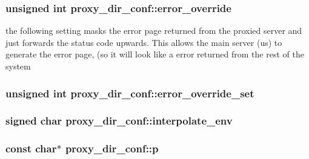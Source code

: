 \subsubsection[{\texorpdfstring{error\+\_\+override}{error_override}}]{\setlength{\rightskip}{0pt plus 5cm}unsigned {\bf int} proxy\+\_\+dir\+\_\+conf\+::error\+\_\+override}\hypertarget{structproxy__dir__conf_a3aea74a60ef8fc76563cb6f4a9ebb3d1}{}\label{structproxy__dir__conf_a3aea74a60ef8fc76563cb6f4a9ebb3d1}
the following setting masks the error page returned from the \textquotesingle{}proxied server\textquotesingle{} and just forwards the status code upwards. This allows the main server (us) to generate the error page, (so it will look like a error returned from the rest of the system 
\subsubsection[{\texorpdfstring{error\+\_\+override\+\_\+set}{error_override_set}}]{\setlength{\rightskip}{0pt plus 5cm}unsigned {\bf int} proxy\+\_\+dir\+\_\+conf\+::error\+\_\+override\+\_\+set}\hypertarget{structproxy__dir__conf_a394c68f9c1ec6a3b7868c544fc7722bf}{}\label{structproxy__dir__conf_a394c68f9c1ec6a3b7868c544fc7722bf}
\subsubsection[{\texorpdfstring{interpolate\+\_\+env}{interpolate_env}}]{\setlength{\rightskip}{0pt plus 5cm}signed char proxy\+\_\+dir\+\_\+conf\+::interpolate\+\_\+env}\hypertarget{structproxy__dir__conf_a14c09f00a8ef3fd674edf324e204f716}{}\label{structproxy__dir__conf_a14c09f00a8ef3fd674edf324e204f716}
\subsubsection[{\texorpdfstring{p}{p}}]{\setlength{\rightskip}{0pt plus 5cm}const char$\ast$ proxy\+\_\+dir\+\_\+conf\+::p}\hypertarget{structproxy__dir__conf_abbc2c066378f469f5c54717c505129b0}{}\label{structproxy__dir__conf_abbc2c066378f469f5c54717c505129b0}
